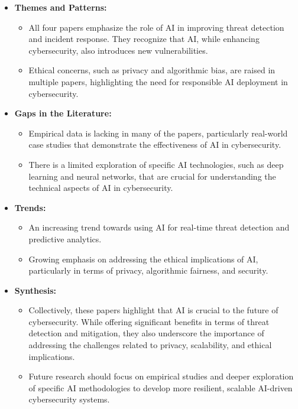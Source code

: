 \documentclass[12pt]{article}
\begin{document}
\begin{itemize} 
    \item \textbf{Themes and Patterns:} 
    \begin{itemize} 
        \item All four papers emphasize the role of AI in improving threat detection and incident response. They recognize that AI, while enhancing cybersecurity, also introduces new vulnerabilities. 
        \item Ethical concerns, such as privacy and algorithmic bias, are raised in multiple papers, highlighting the need for responsible AI deployment in cybersecurity. 
    \end{itemize}
    \item \textbf{Gaps in the Literature:}
    \begin{itemize}
        \item Empirical data is lacking in many of the papers, particularly real-world case studies that demonstrate the effectiveness of AI in cybersecurity.
        \item There is a limited exploration of specific AI technologies, such as deep learning and neural networks, that are crucial for understanding the technical aspects of AI in cybersecurity.
    \end{itemize}

    \item \textbf{Trends:}
    \begin{itemize}
        \item An increasing trend towards using AI for real-time threat detection and predictive analytics.
        \item Growing emphasis on addressing the ethical implications of AI, particularly in terms of privacy, algorithmic fairness, and security.
    \end{itemize}

    \item \textbf{Synthesis:}
    \begin{itemize}
        \item Collectively, these papers highlight that AI is crucial to the future of cybersecurity. While offering significant benefits in terms of threat detection and mitigation, they also underscore the importance of addressing the challenges related to privacy, scalability, and ethical implications.
        \item Future research should focus on empirical studies and deeper exploration of specific AI methodologies to develop more resilient, scalable AI-driven cybersecurity systems.
    \end{itemize}
\end{itemize}
\end{document}
